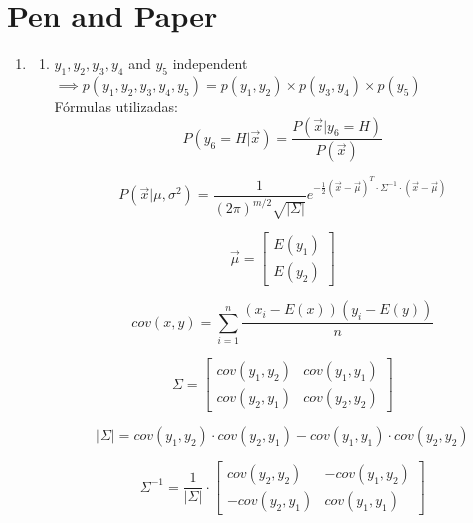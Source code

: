 \documentclass[a4paper,12pt]{article} %
\begin{document}
\section*{Pen and Paper}
\begin{enumerate}

\item 
\begin{enumerate}
\item
${y_1,y_2} , {y_3,y_4}$ and $y_5$ independent $\implies p(y_1,y_2,y_3,y_4,y_5) = p(y_1,y_2)\times p(y_3,y_4)\times p(y_5)$ \\

Fórmulas utilizadas:
\begin{equation}
    P(y_6=H|\vec{x}) = \frac{P(\vec{x}|y_6=H)}{P(\vec{x})}
\end{equation}

\begin{equation}
    P(\vec{x}|\mu, \sigma^2) = \frac{1}{(2\pi)^{m/2} \sqrt{|\Sigma|}}e^{-\frac{1}{2}(\vec{x}-\vec{\mu})^T \cdot \Sigma^{-1} \cdot (\vec{x}-\vec{\mu})}
\end{equation}

\begin{equation}
    \vec{\mu} = \begin{bmatrix} E(y_1) \\ E(y_2)  \end{bmatrix}
\end{equation}

\begin{equation}
    cov(x,y) = \sum_{i=1}^{n} \frac{(x_i - E(x))(y_i - E(y))}{n}
\end{equation}

\begin{equation}
    \Sigma = \begin{bmatrix} cov(y_1,y_2) & cov(y_1,y_1) \\ cov(y_2,y_1) & cov(y_2,y_2) \end{bmatrix}
\end{equation}

\begin{equation}
    |\Sigma| = cov(y_1,y_2) \cdot cov(y_2,y_1) - cov(y_1,y_1) \cdot cov(y_2,y_2)
\end{equation}

\begin{equation}
    \Sigma^{-1} =  \frac{1}{|\Sigma|} \cdot \begin{bmatrix} cov(y_2,y_2) & -cov(y_1,y_2) \\ -cov(y_2,y_1) & cov(y_1,y_1) \end{bmatrix} 
\end{equation}


\end{enumerate}
\end{enumerate}
\end{document}
